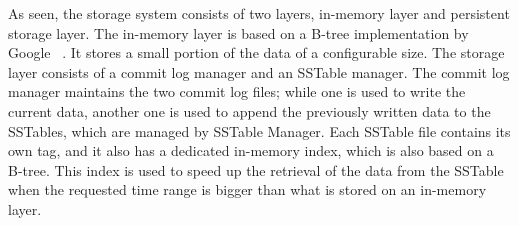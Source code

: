 As seen, the storage system consists of two layers, in-memory layer and persistent storage layer. The in-memory layer is based on a B-tree implementation by Google~\cite{btree_google} . It stores a small portion of the data of a configurable size. The storage layer consists of a commit log manager and an SSTable manager. The commit log manager maintains the two commit log files; while one is used to write the current data, another one is used to append the previously written data to the SSTables, which are managed by SSTable Manager. Each SSTable file contains its own tag, and it also has a dedicated in-memory index, which is also based on a B-tree. This index is used to speed up the retrieval of the data from the SSTable when the requested time range is bigger than what is stored on an in-memory layer.